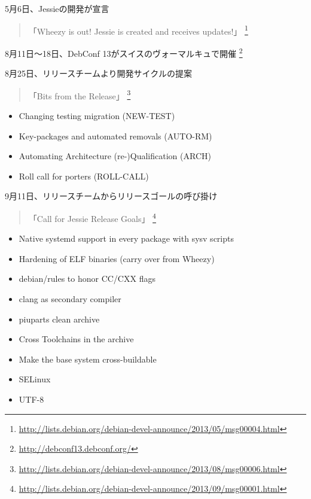 \documentclass[mingoth,a4paper]{jsarticle}
\begin{document}
5月6日、Jessieの開発が宣言
\begin{quote}
  「Wheezy is out! Jessie is created and receives updates!」
  \footnote{\url{http://lists.debian.org/debian-devel-announce/2013/05/msg00004.html}}
\end{quote}

8月11日〜18日、DebConf 13がスイスのヴォーマルキュで開催
\footnote{\url{http://debconf13.debconf.org/}}

8月25日、リリースチームより開発サイクルの提案
\begin{quote}
  「Bits from the Release」
  \footnote{\url{http://lists.debian.org/debian-devel-announce/2013/08/msg00006.html}}
\end{quote}

\begin{screen}
  \begin{itemize}
  \item Changing testing migration (NEW-TEST)
  \item Key-packages and automated removals (AUTO-RM)
  \item Automating Architecture (re-)Qualification (ARCH)
  \item Roll call for porters (ROLL-CALL)
  \end{itemize}
\end{screen}

9月11日、リリースチームからリリースゴールの呼び掛け
\begin{quote}
  「Call for Jessie Release Goals」
  \footnote{\url{http://lists.debian.org/debian-devel-announce/2013/09/msg00001.html}}
\end{quote}

\begin{screen}
  \begin{itemize}
  \item Native systemd support in every package with sysv scripts
  \item Hardening of ELF binaries (carry over from Wheezy)
  \item debian/rules to honor CC/CXX flags
  \item clang as secondary compiler
  \item piuparts clean archive
  \item Cross Toolchains in the archive
  \item Make the base system cross-buildable
  \item SELinux
  \item UTF-8
  \end{itemize}
\end{screen}
\end{document}
